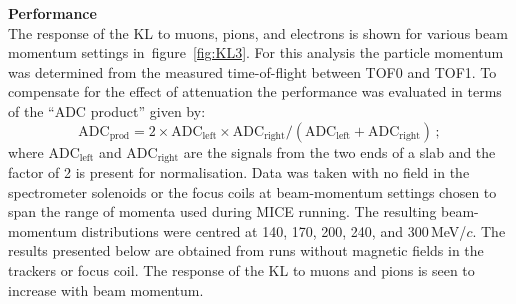 \noindent\textbf{Performance} \\
\noindent
The response of the KL to muons, pions, and electrons is shown for
various beam momentum settings in~figure~\ref{fig:KL3}.
For this analysis the particle momentum was determined from the
measured time-of-flight between TOF0 and TOF1.
To compensate for the effect of attenuation the performance was
evaluated in terms of the ``ADC product'' given by:
\begin{equation}
  \text{ADC}_{\text{prod}} = 2 \times
    \text{ADC}_{\text{left}} \times \text{ADC}_{\text{right}} /
    (\text{ADC}_{\text{left}} + \text{ADC}_{\text{right}})\,;
\end{equation}
where ADC$_{\text{left}}$ and ADC$_{\text{right}}$ are the signals
from the two ends of a slab and the factor of 2 is present for
normalisation.
Data was taken with no field in the spectrometer solenoids or the
focus coils at beam-momentum settings chosen to span the range of
momenta used during MICE running.
The resulting beam-momentum distributions were centred at 140, 170,
200, 240, and 300\,MeV/$c$.
The results presented below are obtained from runs without magnetic
fields in the trackers or focus coil.
The response of the KL to muons and pions is seen to increase with
beam momentum.
